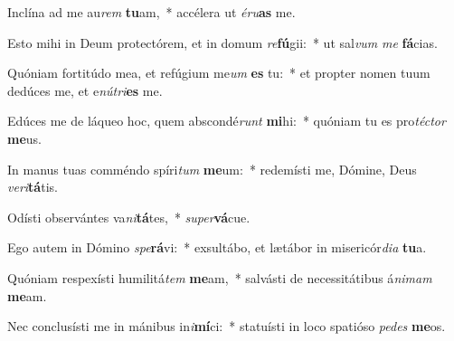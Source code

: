 \item Inclína ad me au\textit{rem} \textbf{tu}am,~* accélera ut \textit{é}\textit{ru}\textbf{as} me.
\item Esto mihi in Deum protectórem, et in domum \textit{re}\textbf{fú}gii:~* ut sal\textit{vum} \textit{me} \textbf{fá}cias.
\item Quóniam fortitúdo mea, et refúgium me\textit{um} \textbf{es} tu:~* et propter nomen tuum dedúces me, et e\textit{nú}\textit{tri}\textbf{es} me.
\item Edúces me de láqueo hoc, quem abscondé\textit{runt} \textbf{mi}hi:~* quóniam tu es pro\textit{téc}\textit{tor} \textbf{me}us.
\item In manus tuas comméndo spíri\textit{tum} \textbf{me}um:~* redemísti me, Dómine, Deus \textit{ve}\textit{ri}\textbf{tá}tis.
\item Odísti observántes va\textit{ni}\textbf{tá}tes,~* \textit{su}\textit{per}\textbf{vá}cue.
\item Ego autem in Dómino \textit{spe}\textbf{rá}vi:~* exsultábo, et lætábor in misericór\textit{di}\textit{a} \textbf{tu}a.
\item Quóniam respexísti humilitá\textit{tem} \textbf{me}am,~* salvásti de necessitátibus á\textit{ni}\textit{mam} \textbf{me}am.
\item Nec conclusísti me in mánibus in\textit{i}\textbf{mí}ci:~* statuísti in loco spatióso \textit{pe}\textit{des} \textbf{me}os.

